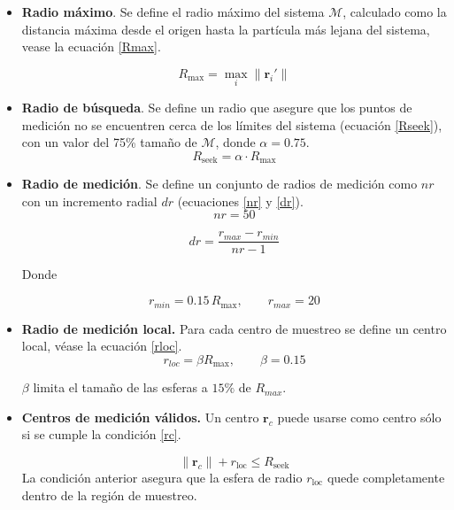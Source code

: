 	\begin{itemize}
		
		\item \textbf{Radio máximo}. Se define el radio máximo del sistema $\mathcal{M}$, calculado como la distancia máxima desde el origen hasta la partícula más lejana del sistema, vease la ecuación \ref{Rmax}.
		
		\begin{equation}
			R_{\text{max}} = \max_i \|\mathbf{r}_i'\|
			\label{Rmax}
		\end{equation}
		
		
		\item \textbf{Radio de búsqueda}. Se define un radio que asegure que los puntos de medición no se encuentren cerca de los límites del sistema (ecuación \ref{Rseek}), con un valor del 75\% tamaño de $\mathcal{M}$, donde $\alpha = 0.75$.
		\begin{equation}
			R_{\text{seek}} = \alpha \cdot R_{\text{max}}
			\label{Rseek}
		\end{equation}
		
		
		\item \textbf{Radio de medición}. Se define un conjunto de radios de medición como $nr$ con un incremento radial $dr$ (ecuaciones \ref{nr} y \ref{dr}).
		\begin{equation}
			nr = 50 
			\label{nr}
		\end{equation}
		
		\begin{equation}
			dr = \frac{r_{max}-r_{min}}{nr-1}
			\label{dr}
		\end{equation}
		
		Donde 
		
		\begin{equation}
			r_{min} = 0.15\, R_{\text{max}}, \qquad
			r_{max} = 20
		\end{equation}
		
		
		\item \textbf{Radio de medición local.} Para cada centro de muestreo se define
		un centro local, véase la ecuación \ref{rloc}.
		\begin{equation}
			r_{loc} = \beta R_{\text{max}}, \qquad \beta = 0.15
			\label{rloc}
		\end{equation} 
		
		$\beta$ limita el tamaño de las esferas a $15\%$ de $R_{max}$.
		
		\item \textbf{Centros de medición válidos.} 
		Un centro $\mathbf{r}_c$ puede usarse como centro sólo si se cumple la condición \ref{rc}. 
		
		\begin{equation}
			\|\mathbf{r}_c\| + r_{\mathrm{loc}} \le R_{\text{seek}}
			\label{rc}
		\end{equation}
		La condición anterior asegura que la esfera de radio $r_{\text{loc}}$ quede completamente dentro de la región de muestreo.
		\end{itemize}


